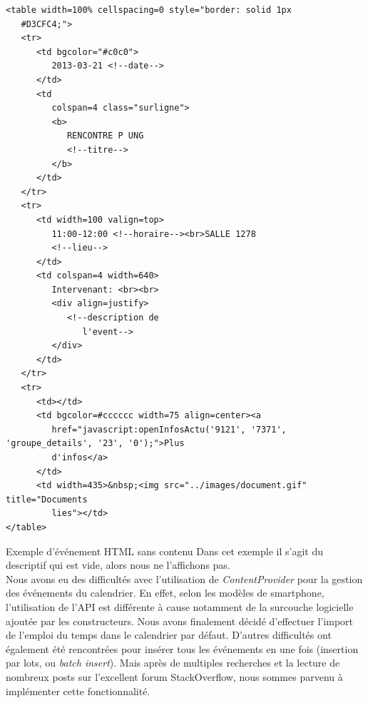 \begin{adjustbox}{minipage=1.14\textwidth,margin=0pt \smallskipamount,center}
\begin{lstlisting}[style=HTML, label=htmlCode]
<table width=100% cellspacing=0 style="border: solid 1px 
   #D3CFC4;">
   <tr>
      <td bgcolor="#c0c0">
         2013-03-21 <!--date-->
      </td>
      <td
         colspan=4 class="surligne">
         <b>
            RENCONTRE P UNG
            <!--titre-->
         </b>
      </td>
   </tr>
   <tr>
      <td width=100 valign=top>
         11:00-12:00 <!--horaire--><br>SALLE 1278
         <!--lieu-->
      </td>
      <td colspan=4 width=640>
         Intervenant: <br><br>
         <div align=justify>
            <!--description de
               l'event-->
         </div>
      </td>
   </tr>
   <tr>
      <td></td>
      <td bgcolor=#cccccc width=75 align=center><a
         href="javascript:openInfosActu('9121', '7371', 'groupe_details', '23', '0');">Plus
         d'infos</a>
      </td>
      <td width=435>&nbsp;<img src="../images/document.gif" title="Documents 
         lies"></td>
</table>
\end{lstlisting}
\end{adjustbox}

Exemple d'événement HTML sans contenu
Dans cet exemple il s'agit du descriptif qui est vide, alors nous ne l'affichons pas. \\

Nous avons eu des difficultés avec l’utilisation de \emph{ContentProvider} pour la gestion des événements du calendrier. En effet, selon les modèles de smartphone, l’utilisation de l’API est différente à cause notamment de la surcouche logicielle ajoutée par les constructeurs. Nous avons finalement décidé d’effectuer l’import de l’emploi du temps dans le calendrier par défaut. D’autres difficultés ont également été rencontrées pour insérer tous les événements en une fois (insertion par lots, ou \emph{batch insert}). Mais après de multiples recherches et la lecture de nombreux posts sur l’excellent forum StackOverflow, nous sommes parvenu à implémenter cette fonctionnalité. \\

